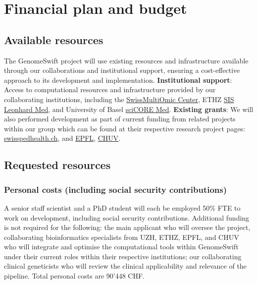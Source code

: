 
\section{Financial plan and budget}\label{budget}

\hypertarget{available-resources}{%
\subsection{Available resources}\label{available-resources}}

The GenomeSwift project will use existing resources and infrastructure
available through our collaborations and institutional support, ensuring
a cost-effective approach to its development and implementation.
\textbf{Institutional support}: Access to computational resources and
infrastructure provided by our collaborating institutions, including the
\href{http://smoc.ethz.ch/}{SwissMultiOmic Center}, ETHZ
\href{https://unlimited.ethz.ch/display/LeoMed2/Leonhard+Med+Intro+for+shareholders}{SIS
Leonhard Med}, and University of Basel
\href{https://scicore.unibas.ch/}{sciCORE Med}. \textbf{Existing
grants}: We will also performed development as part of current funding
from related projects within our group which can be found at their
respective research project pages:
\href{https://www.swisspedhealth.ch/}{swisspedhealth.ch}, and
\href{https://www.epfl.ch/labs/fellay-lab/}{EPFL},
\href{https://www.chuv.ch/en/bdsc/research/our-groups/precision-medicine}{CHUV}.

\hypertarget{requested-resources}{%
\subsection{Requested resources}\label{requested-resources}}

\hypertarget{personal-costs-including-social-security-contributions}{%
\subsubsection{Personal costs (including social security
contributions)}\label{personal-costs-including-social-security-contributions}}

A senior staff scientist and a PhD student will each be employed 50\%
FTE to work on development, including social security contributions.
Additional funding is not required for the following: the main applicant
who will oversee the project, collaborating bioinformatics specialists
from UZH, ETHZ, EPFL, and CHUV who will integrate and optimise the
computational tools within GenomeSwift under their current roles within
their respective institutions; our collaborating clinical geneticists
who will review the clinical applicability and relevance of the
pipeline. Total personal costs are 90'448 CHF.

